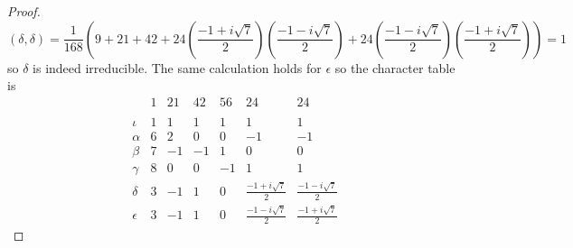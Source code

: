 \documentclass{article}
\begin{document}
\begin{proof}
\[
(\delta, \delta) = \frac{1}{168} \left (9 + 21 + 42 + 24 \left (\frac{-1 + i \sqrt{7}}{2} \right ) \left (\frac{-1 - i \sqrt{7}}{2} \right ) + 24 \left (\frac{-1 - i \sqrt{7}}{2} \right ) \left (\frac{-1 + i \sqrt{7}}{2} \right ) \right ) = 1
\]
so $\delta$ is indeed irreducible. The same calculation holds for $\epsilon$ so the character table is
\[
\begin{array}{rrrrrrr}
& 1 & 21 & 42 & 56 & 24 & 24\\
&&&&&&\\
\iota & 1 & 1 & 1 & 1 & 1 & 1\\
\alpha & 6 & 2 & 0 & 0 & -1 & -1\\
\beta & 7 & -1 & -1 & 1 & 0 & 0\\
\gamma & 8 & 0 & 0 & -1 & 1 & 1\\
\delta & 3 & -1 & 1 & 0 & \frac{-1 + i \sqrt{7}}{2} & \frac{-1 - i \sqrt{7}}{2}\\
\epsilon & 3 & -1 & 1 & 0 & \frac{-1 - i \sqrt{7}}{2} & \frac{-1 + i \sqrt{7}}{2}
\end{array}
\]
\end{proof}
\end{document}
